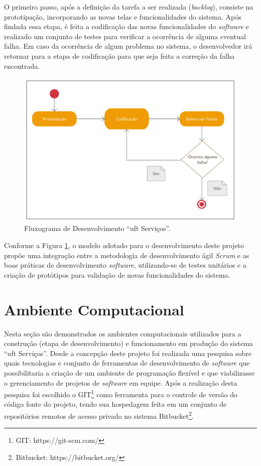 O primeiro passo, após a definição da tarefa a ser realizada (\textit{backlog}), consiste na prototipação, incorporando as novas telas e funcionalidades do sistema. Após findada essa etapa,  é feita a codificação das novas funcionalidades do \textit{software} e realizado um conjunto de testes para verificar a ocorrência de alguma eventual falha. Em caso da ocorrência de algum problema no sistema, o desenvolvedor irá retornar para a etapa de codificação para que seja feita a correção da falha encontrada.

\begin{figure}[!h]
  \centering
  \includegraphics[width=.7\textwidth]{figuras/fluxograma_dev.eps} 
  \caption{Fluxograma de Desenvolvimento ``\acrshort{uft} Serviços''.}
  \label{fluxograma-dev} 
\end{figure} 

Conforme a Figura \ref{fluxograma-dev}, o modelo adotado para o desenvolvimento deste projeto propõe uma integração entre a metodologia de desenvolvimento ágil \textit{Scrum} e as boas práticas de desenvolvimento \textit{software}, utilizando-se de testes unitários e a criação de protótipos para validação de novas funcionalidades do sistema.

\section{Ambiente Computacional}

\noindent Nesta seção são demonstrados os ambientes computacionais utilizados para a construção (etapa de desenvolvimento) e funcionamento em produção do sistema ``\acrshort{uft} Serviços''. Desde a concepção deste projeto foi realizada uma pesquisa sobre quais tecnologias e conjunto de ferramentas de desenvolvimento de \textit{software} que possibilitaria a criação de um ambiente de programação flexível e que viabilizasse o gerenciamento de projetos de \textit{software} em equipe. Após a realização desta pesquisa foi escolhido o GIT\footnote{GIT: https://git-scm.com/} como ferramenta para o controle de versão do código fonte do projeto, tendo sua hospedagem feita em um conjunto de repositórios remotos de acesso privado no sistema Bitbucket\footnote{Bitbucket: https://bitbucket.org/}.

